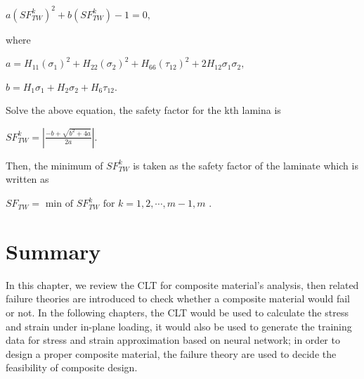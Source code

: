 $a(SF_{TW}^k)^2 + b(SF_{TW}^k) - 1 = 0 \textstyle{,}$

where 


$a = H_{11}(\sigma_1)^2 + H_{22}(\sigma_2)^2 +H_{66}(\tau_{12})^2 +
2H_{12}\sigma_1 \sigma_2 \textstyle{,} $


$b = H_1\sigma_1 + H_2 \sigma_2 + H_6 \tau_{12} \textstyle{.}$ 


Solve the above equation, the safety factor for the kth lamina is 

$SF_{TW}^k = |\frac{-b+ \sqrt{b^2 + 4a}}{2a}|$.

Then, the minimum of $SF_{TW}^k$ is taken as the safety factor of the
laminate which is written as

$SF_{TW}= \text{ min of } SF_{TW}^k \text{ for } k=1,2,\cdots, m-1,m$ .



\section{Summary}
In this chapter, we review the CLT for composite material's analysis, then
related failure theories are introduced to check whether a composite material
would fail or not. In the following chapters, the CLT would be used to
calculate the stress and strain under in-plane loading, it would also be used
to generate the training data for stress and strain approximation based on
neural network; in order to design a proper composite material, the failure theory 
are used to decide the feasibility of composite design.

